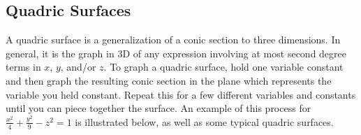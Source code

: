 \subsection{Quadric Surfaces}
A quadric surface is a generalization of a conic section to three
dimensions.  In general, it is the graph in 3D of any expression
involving at most second degree terms in $x$, $y$, and/or $z$. To
graph a quadric surface, hold one variable constant and then graph the
resulting conic section in the plane which represents the variable you
held constant. Repeat this for a few different variables and constants
until you can piece together the surface.  An example of this process
for $\frac{x^2}{4}+\frac{y^2}{9}-z^2 =1$ is illustrated below, as well
as some typical quadric surfaces.  \renewcommand{\mywidth}{.9in}
\begin{center}
\begin{tabular}{cccc}


\end{tabular}
\end{center}
